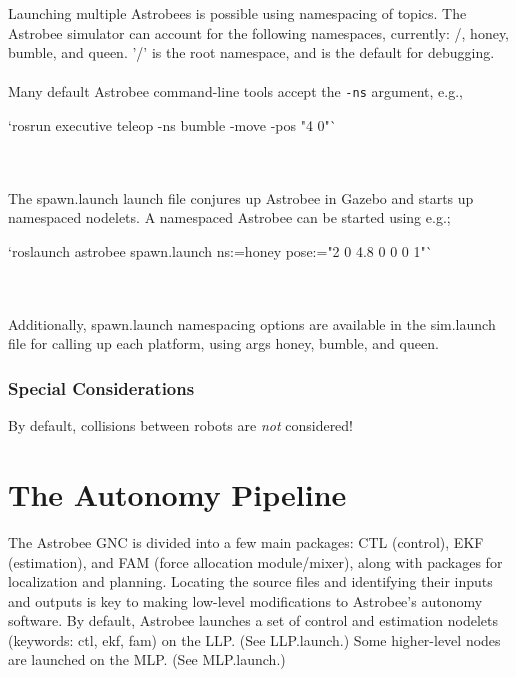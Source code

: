 \documentclass{article}
\begin{document}
Launching multiple Astrobees is possible using namespacing of topics. The Astrobee simulator can account for the following namespaces, currently: /, honey, bumble, and queen. '/' is the root namespace, and is the default for debugging.
\\\\
Many default Astrobee command-line tools accept the \texttt{-ns} argument, e.g.,\\
\begin{markdown}
`rosrun executive teleop -ns bumble -move -pos "4 0"`
\end{markdown}
\\\\
The spawn.launch launch file conjures up Astrobee in Gazebo and starts up namespaced nodelets. A namespaced Astrobee can be started using e.g.;\\
\begin{markdown}
`roslaunch astrobee spawn.launch ns:=honey pose:="2 0 4.8 0 0 0 1"`
\end{markdown}
\\\\
Additionally, spawn.launch namespacing options are available in the sim.launch file for calling up each platform, using args honey, bumble, and queen.

\subsubsection{Special Considerations}

By default, collisions between robots are \textit{not} considered!

\section{The Autonomy Pipeline}

The Astrobee GNC is divided into a few main packages: CTL (control), EKF (estimation), and FAM (force allocation module/mixer), along with packages for localization and planning. Locating the source files and identifying their inputs and outputs is key to making low-level modifications to Astrobee's autonomy software. By default, Astrobee launches a set of control and estimation nodelets (keywords: ctl, ekf, fam) on the LLP. (See LLP.launch.) Some higher-level nodes are launched on the MLP. (See MLP.launch.)
\end{document}
